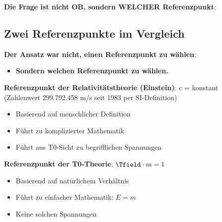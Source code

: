 	\textbf{Die Frage ist nicht OB, sondern WELCHER Referenzpunkt}:
	
	\begin{table}[htbp]
		\centering
		\caption{Vergleich der Referenzpunktsysteme}
	\end{table}
	
	\subsection{Zwei Referenzpunkte im Vergleich}
	
	\textbf{Der Ansatz war nicht, einen Referenzpunkt zu wählen}:
	\begin{itemize}
		\item \textbf{Sondern welchen Referenzpunkt zu wählen.}
	\end{itemize}
	
	\textbf{Referenzpunkt der Relativitätstheorie (Einstein)}: c = konstant (Zahlenwert 299.792.458 m/s seit 1983 per SI-Definition)
	\begin{itemize}
		\item Basierend auf menschlicher Definition
		\item Führt zu komplizierter Mathematik
		\item Führt aus T0-Sicht zu begrifflichen Spannungen
	\end{itemize}
	
	\textbf{Referenzpunkt der T0-Theorie}: $\Tfield \cdot m = 1$
	\begin{itemize}
		\item Basierend auf natürlichem Verhältnis
		\item Führt zu einfacher Mathematik: $E = m$
		\item Keine solchen Spannungen
	\end{itemize}
	
